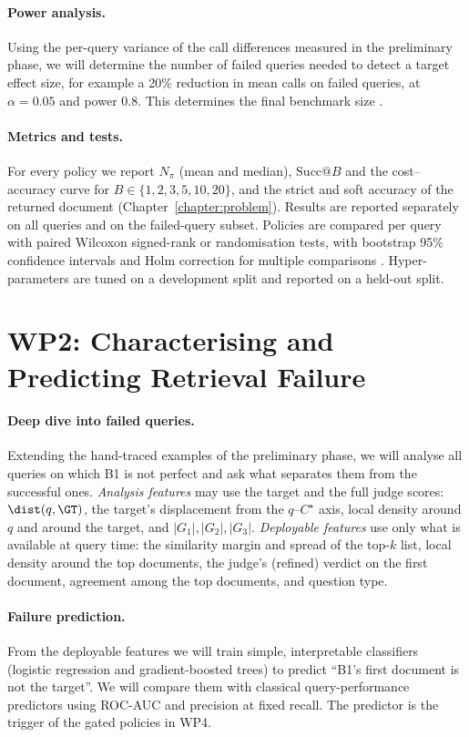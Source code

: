 \paragraph{Power analysis.}
Using the per-query variance of the call differences measured in the preliminary phase, we will determine the number of failed queries needed to detect a target effect size, for example a 20\% reduction in mean calls on failed queries, at $\alpha=0.05$ and power $0.8$. This determines the final benchmark size \citep{sakai2016statistical}.

\paragraph{Metrics and tests.}
For every policy we report $N_\pi$ (mean and median), $\mathrm{Succ}@B$ and the cost--accuracy curve for $B\in\{1,2,3,5,10,20\}$, and the strict and soft accuracy of the returned document (Chapter~\ref{chapter:problem}). Results are reported separately on all queries and on the failed-query subset. Policies are compared per query with paired Wilcoxon signed-rank or randomisation tests, with bootstrap 95\% confidence intervals and Holm correction for multiple comparisons \citep{smucker2007comparison}. Hyper-parameters are tuned on a development split and reported on a held-out split.

\section{WP2: Characterising and Predicting Retrieval Failure}

\paragraph{Deep dive into failed queries.}
Extending the hand-traced examples of the preliminary phase, we will analyse all queries on which B1 is not perfect and ask what separates them from the successful ones. \emph{Analysis features} may use the target and the full judge scores: $\dist(q,\GT)$, the target's displacement from the $q$--$C^\star$ axis, local density around $q$ and around the target, and $|G_1|,|G_2|,|G_3|$. \emph{Deployable features} use only what is available at query time: the similarity margin and spread of the top-$k$ list, local density around the top documents, the judge's (refined) verdict on the first document, agreement among the top documents, and question type.

\paragraph{Failure prediction.}
From the deployable features we will train simple, interpretable classifiers (logistic regression and gradient-boosted trees) to predict ``B1's first document is not the target''. We will compare them with classical query-performance predictors \citep{cronentownsend2002predicting,carmel2010estimating} using ROC-AUC and precision at fixed recall. The predictor is the trigger of the gated policies in WP4.

